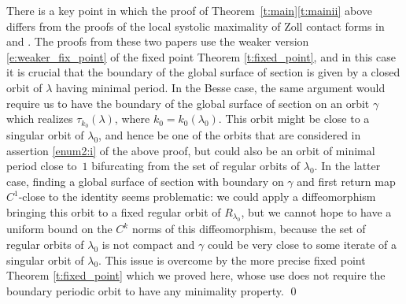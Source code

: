 \begin{rem}
\label{newrem}
There is a key point in which the proof of Theorem~\ref{t:main}\eqref{t:mainii} above differs from the proofs of the local systolic maximality of Zoll contact forms in \cite{Abbondandolo:2018fb} and \cite{Benedetti:2021aa}. The proofs from these two papers use the weaker version \eqref{e:weaker_fix_point} of the fixed point Theorem \ref{t:fixed_point}, and in this case it is crucial that the boundary of the global surface of section is given by a closed orbit of $\lambda$ having minimal period. In the Besse case, the same argument would require us to have the boundary of the global surface of section on an orbit $\gamma$ which realizes $\tau_{k_0}(\lambda)$, where $k_0=k_0(\lambda_0)$. This orbit might be close to a singular orbit of $\lambda_0$, and hence be one of the orbits that are considered in assertion \eqref{enum2:i} of the above proof, but could also be an orbit of minimal period close to~$1$ bifurcating from the set of regular orbits of $\lambda_0$. In the latter case, finding a global surface of section with boundary on $\gamma$ and first return map $C^1$-close to the identity seems problematic:
we could apply a diffeomorphism bringing this orbit to a fixed regular orbit of $R_{\lambda_0}$, but we cannot hope to have a uniform bound on the $C^k$ norms of this diffeomorphism, because the set of regular orbits of $\lambda_0$ is not compact and $\gamma$ could be very close to some iterate of a singular orbit of $\lambda_0$. This issue is overcome by the more precise fixed point Theorem \ref{t:fixed_point} which we proved here, whose use does not require the boundary periodic orbit to have any minimality property.
\hfill\qed
\end{rem}
